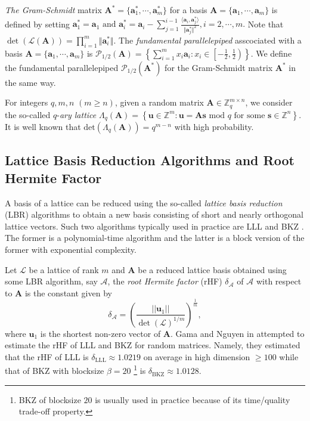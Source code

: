 \documentclass[runningheads]{llncs}
\begin{document}
\textit{The Gram-Schmidt} matrix $\mathbf{A}^{*}=\{\mathbf{a}^{*}_1,\cdots,\mathbf{a}^{*}_{m} \}$ for a basis $\mathbf{A}=\{\mathbf{a}_1,\cdots,\mathbf{a}_{m} \}$ is defined by setting
$\mathbf{a}^{*}_1=\mathbf{a}_1\text{ and } \mathbf{a}^{*}_{i}=\mathbf{a}_{i}-\sum_{j=1}^{i-1} \frac{\langle \mathbf{a}_{i}, \mathbf{a}^{*}_j \rangle}{\Vert\mathbf{a}^{*}_j\Vert^2},  i=2,\cdots,m.$ Note that $\det(\mathcal{L}{(\mathbf{A})})=\prod_{i=1}^{m}\Vert \mathbf{a}_i^* \Vert.$
The \textit{fundamental parallelepiped} asscociated with a basis $\mathbf{A}=\{\mathbf{a}_1,\cdots,\mathbf{a}_{m}\}$ is $\mathcal{P}_{1/2}(\mathbf{A})=\left\{ \sum_{i=1}^{m} x_i\mathbf{a}_i: x_i \in \left[-\frac{1}{2},\frac{1}{2} \right)\right\}. $ We define the fundamental parallelepiped $\mathcal{P}_{1/2}(\mathbf{A}^{*})$ for the Gram-Schmidt matrix $\mathbf{A}^{*}$ in the same way.


For integers $q, m, n$ $(m \geq n)$, given a random matrix $\mathbf{A} \in \mathbb{Z}_q^{m \times n}$, we consider the so-called $q$-\textit{ary lattice}
$\Lambda_q{(\mathbf{A})}=\left\{ \mathbf{u} \in \mathbb{Z}^m: \mathbf{u}=\mathbf{A}\mathbf{s} \text{ mod } q \text{ for some } \mathbf{s} \in \mathbb{Z}^n \right\}.$
It is well known that $\text{det}(\Lambda_q(\mathbf{A})) = q^{m-n}$ with high probability.
\subsection{Lattice Basis Reduction Algorithms and Root Hermite Factor} \label{sec2.2}
A basis of a lattice can be reduced using the so-called \textit{lattice basis reduction} (LBR) algorithms to obtain a new basis consisting of short and nearly orthogonal lattice vectors. Such two algorithms typically used in practice are LLL \cite{LLL82} and BKZ \cite{SE94}. The former is a polynomial-time algorithm and the latter is a block version of the former with exponential complexity.

Let $\mathcal{L}$ be a lattice of rank $m$ and $\mathbf{A}$ be a reduced lattice basis obtained using some LBR algorithm, say $\mathcal{A} $, the \textit{root Hermite factor} (rHF) $\delta_{\mathcal{A}}$ of $\mathcal{A} $ with respect to $\mathbf{A} $ is the constant given by
\begin{equation}\label{keyk}
\delta_{\mathcal{A} }=\left( \frac{||\mathbf{u}_1||}{\det(\mathcal{L})^{1/m}} \right)^{\frac{1}{m}},
\end{equation}
where $\mathbf{u}_1$ is the shortest non-zero vector of $\mathbf{A} $. 
Gama and Nguyen in \cite{GM08} attempted to estimate the rHF of LLL and BKZ for random matrices. Namely, they estimated that the rHF of LLL is $\delta_{\text{LLL}}\approx 1.0219$ on average in high dimension $\geq 100$ while  that of BKZ with blocksize $\beta=20$ \footnote[1]{BKZ of blocksize $20$ is usually used in practice because of its time/quality trade-off property.} is $\delta_{\text{BKZ}}\approx 1.0128$.
\end{document}

